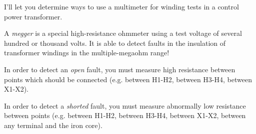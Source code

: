 I'll let you determine ways to use a multimeter for winding tests in a control power transformer.

\vskip 10pt

A {\it megger} is a special high-resistance ohmmeter using a test voltage of several hundred or thousand volts.  It is able to detect faults in the insulation of transformer windings in the multiple-megaohm range!








In order to detect an {\it open} fault, you must measure high resistance between points which should be connected (e.g. between H1-H2, between H3-H4, between X1-X2).

\vskip 10pt

In order to detect a {\it shorted} fault, you must measure abnormally low resistance between points (e.g. between H1-H2, between H3-H4, between X1-X2, between any terminal and the iron core).




